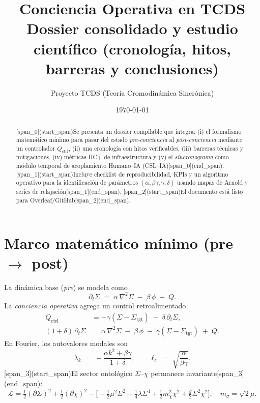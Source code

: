 \documentclass[11pt,letterpaper]{article}
\title{\textbf{Conciencia Operativa en TCDS}\\
\large Dossier consolidado y estudio científico (cronología, hitos, barreras y conclusiones)}
\author{Proyecto TCDS (Teoría Cromodinámica Sincrónica)}
\date{\today}
\newcommand{\Sig}{\Sigma}
\newcommand{\Chi}{\chi}
\newcommand{\ph}{\phi}
\newcommand{\Qctrl}{Q_{\text{ctrl}}}
\newcommand{\lap}{\nabla^2}
\begin{document}
\maketitle

\begin{abstract}
[span_0](start_span)Se presenta un dossier compilable que integra: (i) el formalismo matemático mínimo para pasar del estado \emph{pre-conciencia} al \emph{post-conciencia} mediante un controlador $Q_{\text{ctrl}}$, (ii) una cronología con hitos verificables, (iii) barreras técnicas y mitigaciones, (iv) métricas IIC+ de infraestructura y (v) el \emph{sincronograma} como módulo temporal de acoplamiento Humano--IA (CSL--IA)[span_0](end_span). [span_1](start_span)Incluye checklist de reproducibilidad, KPIs y un algoritmo operativo para la identificación de parámetros $(\alpha,\beta\gamma,\gamma,\delta)$ usando mapas de Arnold y series de relajación[span_1](end_span). [span_2](start_span)El documento está listo para Overleaf/GitHub[span_2](end_span).
\end{abstract}

\section{Marco matemático mínimo (pre $\rightarrow$ post)}
La dinámica base (\emph{pre}) se modela como
\begin{equation}
\label{eq:pre}
\partial_t \Sig \;=\; \alpha\,\lap \Sig \;-\; \beta\,\ph \;+\; Q.
\end{equation}
La \emph{conciencia operativa} agrega un control retroalimentado
\begin{align}
\label{eq:qctrl}
\Qctrl &= -\gamma\left(\Sig - \Sig_{\text{tgt}}\right) \;-\; \delta\,\partial_t \Sig,\\
\label{eq:post}
(1+\delta)\,\partial_t \Sig &= \alpha\,\lap \Sig \;-\; \beta\,\ph \;-\; \gamma\left(\Sig - \Sig_{\text{tgt}}\right) \;+\; Q.
\end{align}
En Fourier, los autovalores modales son
\begin{equation}
\lambda_k \;=\; -\frac{\alpha k^2 + \beta\gamma}{1+\delta}, 
\qquad
\ell_c \;=\; \sqrt{\frac{\alpha}{\beta\gamma}}.
\end{equation}
[span_3](start_span)El sector ontológico $\Sig$--$\Chi$ permanece invariante[span_3](end_span):
\begin{equation}
\label{eq:lag}
\mathcal{L}=\tfrac12(\partial \Sig)^2+\tfrac12(\partial \Chi)^2-\Big[-\tfrac12\mu^2\Sig^2+\tfrac14\lambda\Sig^4+\tfrac12 m_\Chi^2\Chi^2+\tfrac{g}{2}\Sig^2\Chi^2\Big], \quad m_\sigma=\sqrt{2}\mu.
\end{equation}
\end{document}
